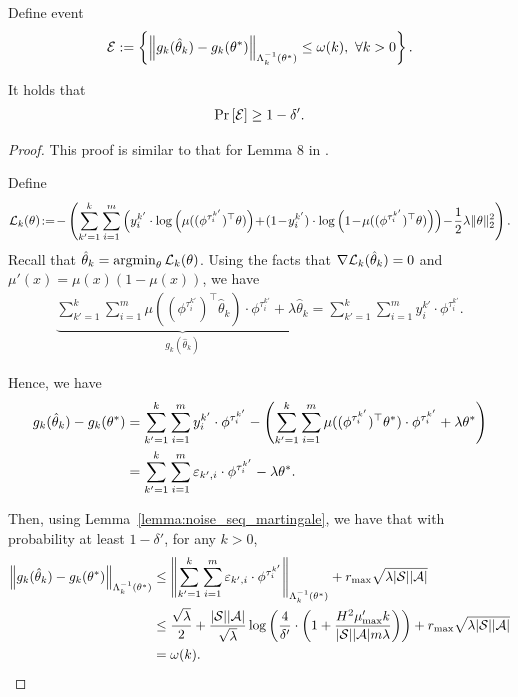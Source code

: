 Define event
\begin{align*}
	\mathcal{E}:=\left\{  \left\| g_k(\hat{\theta}_k) - g_k(\theta^*)  \right\|_{\Lambda_k^{-1}(\theta^*)} \leq \omega(k), \  \forall k>0  \right\} .
\end{align*}
\begin{lemma}
	It holds that
	\begin{align*}
		\Pr \left[  \mathcal{E}  \right] \geq 1-\delta' .
	\end{align*}
\end{lemma}
\begin{proof}
	This proof is similar to that for Lemma 8 in \cite{faury2020improved}.
	
	Define
	\begin{align*}
		\cL_k(\theta) \!:=\! - \sbr{ \sum_{k'=1}^{k} \sum_{i=1}^{m} \sbr{ y^{k'}_i \cdot \log\sbr{\mu((\phi^{\tau^{k'}_i})^\top \theta)} \!+\! (1 \!-\! y^{k'}_i) \cdot \log\sbr{1 \!-\! \mu((\phi^{\tau^{k'}_i})^\top \theta) } } \!-\! \frac{1}{2} \lambda \|\theta\|_2^2 } .
	\end{align*}
	Recall that $\hat{\theta}_k = \argmin_{\theta} \cL_k(\theta)$.
	Using the facts that $\nabla \mathcal{L}_k(\hat{\theta}_k)=0$ and $\mu'(x)=\mu(x)(1-\mu(x))$, we have
	\begin{align*}
		\underbrace{\sum_{k'=1}^{k} \sum_{i=1}^{m} \mu( (\phi^{\tau^{k'}_i})^\top \hat{\theta}_k ) \cdot \phi^{\tau^{k'}_i} + \lambda \hat{\theta}_k}_{g_k(\hat{\theta}_k)} = 	\sum_{k'=1}^{k} \sum_{i=1}^{m} y^{k'}_i \cdot \phi^{\tau^{k'}_i} .
	\end{align*}
	
	Hence, we have
	\begin{align}
		g_k(\hat{\theta}_k) - g_k(\theta^*) &= \sum_{k'=1}^{k} \sum_{i=1}^{m} y^{k'}_i \cdot \phi^{\tau^{k'}_i} - \left(  \sum_{k'=1}^{k} \sum_{i=1}^{m} \mu( (\phi^{\tau^{k'}_i})^\top \theta^* ) \cdot \phi^{\tau^{k'}_i} + \lambda \theta^*  \right)
		\nonumber\\
		&= \sum_{k'=1}^{k} \sum_{i=1}^{m} \varepsilon_{k',i} \cdot \phi^{\tau^{k'}_i} -  \lambda \theta^* . \label{eq:g_hat_theta-g_theta_star}
	\end{align}
	
	
	Then, using Lemma~\ref{lemma:noise_seq_martingale}, we have that with probability at least $1-\delta'$, for any $k>0$,
	\begin{align*}
		\left\|  g_k(\hat{\theta}_k) - g_k(\theta^*)  \right\|_{\Lambda_k^{-1}(\theta^*)} &\leq \left\|  \sum_{k'=1}^{k} \sum_{i=1}^{m} \varepsilon_{k',i} \cdot \phi^{\tau^{k'}_i}  \right\|_{\Lambda_k^{-1}(\theta^*)} + r_{\max} \sqrt{\lambda |\mathcal{S}| |\mathcal{A}|} 
		\\
		&\leq \frac{\sqrt{\lambda}}{2} + \frac{|\mathcal{S}||\mathcal{A}|}{\sqrt{\lambda}} \log \left(  \frac{4}{\delta'} \cdot \left(  1 + \frac{H^2 \mu'_{\max} k}{|\mathcal{S}||\mathcal{A}| m \lambda}    \right)   \right) + r_{\max} \sqrt{\lambda |\mathcal{S}| |\mathcal{A}|}  
		\\
		&= \omega(k) .
	\end{align*}
	
	
	
\end{proof}

